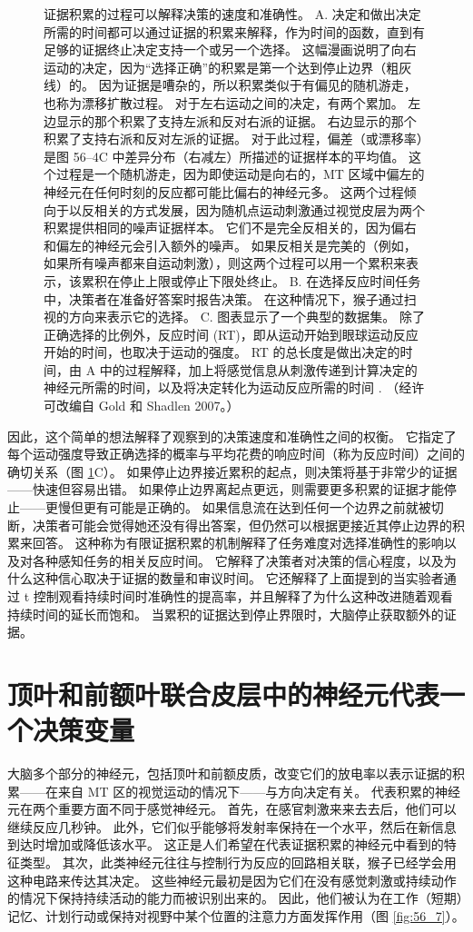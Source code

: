 \begin{figure}[htbp]
	\caption{证据积累的过程可以解释决策的速度和准确性。 A. 决定和做出决定所需的时间都可以通过证据的积累来解释，作为时间的函数，直到有足够的证据终止决定支持一个或另一个选择。 这幅漫画说明了向右运动的决定，因为“选择正确”的积累是第一个达到停止边界（粗灰线）的。 因为证据是嘈杂的，所以积累类似于有偏见的随机游走，也称为漂移扩散过程。 对于左右运动之间的决定，有两个累加。 左边显示的那个积累了支持左派和反对右派的证据。 右边显示的那个积累了支持右派和反对左派的证据。 对于此过程，偏差（或漂移率）是图 56–4C 中差异分布（右减左）所描述的证据样本的平均值。 这个过程是一个随机游走，因为即使运动是向右的，MT 区域中偏左的神经元在任何时刻的反应都可能比偏右的神经元多。 这两个过程倾向于以反相关的方式发展，因为随机点运动刺激通过视觉皮层为两个积累提供相同的噪声证据样本。 它们不是完全反相关的，因为偏右和偏左的神经元会引入额外的噪声。 如果反相关是完美的（例如，如果所有噪声都来自运动刺激），则这两个过程可以用一个累积来表示，该累积在停止上限或停止下限处终止。 B. 在选择反应时间任务中，决策者在准备好答案时报告决策。 在这种情况下，猴子通过扫视的方向来表示它的选择。 C. 图表显示了一个典型的数据集。 除了正确选择的比例外，反应时间 (RT)，即从运动开始到眼球运动反应开始的时间，也取决于运动的强度。 RT 的总长度是做出决定的时间，由 A 中的过程解释，加上将感觉信息从刺激传递到计算决定的神经元所需的时间，以及将决定转化为运动反应所需的时间 . （经许可改编自 Gold 和 Shadlen 2007。）}
	\label{fig:56_6}
\end{figure}


因此，这个简单的想法解释了观察到的决策速度和准确性之间的权衡。
它指定了每个运动强度导致正确选择的概率与平均花费的响应时间（称为反应时间）之间的确切关系（图 \ref{fig:56_6}C）。
如果停止边界接近累积的起点，则决策将基于非常少的证据——快速但容易出错。
如果停止边界离起点更远，则需要更多积累的证据才能停止——更慢但更有可能是正确的。
如果信息流在达到任何一个边界之前就被切断，决策者可能会觉得她还没有得出答案，但仍然可以根据更接近其停止边界的积累来回答。
这种称为有限证据积累的机制解释了任务难度对选择准确性的影响以及对各种感知任务的相关反应时间。
它解释了决策者对决策的信心程度，以及为什么这种信心取决于证据的数量和审议时间。
它还解释了上面提到的当实验者通过 t 控制观看持续时间时准确性的提高率，并且解释了为什么这种改进随着观看持续时间的延长而饱和。
当累积的证据达到停止界限时，大脑停止获取额外的证据。


\section{顶叶和前额叶联合皮层中的神经元代表一个决策变量}

大脑多个部分的神经元，包括顶叶和前额皮质，改变它们的放电率以表示证据的积累——在来自 MT 区的视觉运动的情况下——与方向决定有关。
代表积累的神经元在两个重要方面不同于感觉神经元。
首先，在感官刺激来来去去后，他们可以继续反应几秒钟。
此外，它们似乎能够将发射率保持在一个水平，然后在新信息到达时增加或降低该水平。
这正是人们希望在代表证据积累的神经元中看到的特征类型。
其次，此类神经元往往与控制行为反应的回路相关联，猴子已经学会用这种电路来传达其决定。
这些神经元最初是因为它们在没有感觉刺激或持续动作的情况下保持持续活动的能力而被识别出来的。
因此，他们被认为在工作（短期）记忆、计划行动或保持对视野中某个位置的注意力方面发挥作用（图 \ref{fig:56_7}）。


